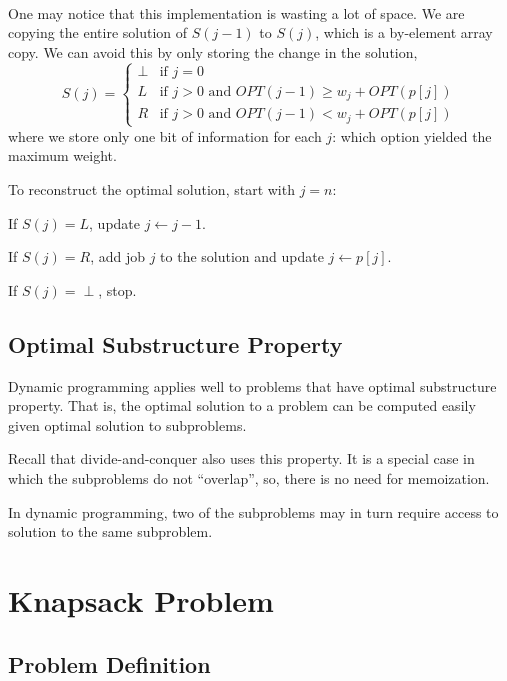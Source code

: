 {~~~}

One may notice that this implementation is wasting a lot of space. We are copying the entire solution of $S(j - 1)$ to $S(j)$, which is a by-element array copy. We can avoid this by only storing the change in the solution, \[
    S(j) = \begin{cases}
        \perp & \text{if } j = 0                                             \\
        L     & \text{if } j > 0 \text{ and } OPT(j - 1) \ge w_j + OPT(p[j]) \\
        R     & \text{if } j > 0 \text{ and } OPT(j - 1) < w_j + OPT(p[j])
    \end{cases}
\] where we store only one bit of information for each $j$: which option yielded the maximum weight. 

To reconstruct the optimal solution, start with $j = n$:
\begin{listu}
    \item If $S(j) = L$, update $j \gets j - 1$.
    \item If $S(j) = R$, add job $j$ to the solution and update $j \gets p[j]$.
    \item If $S(j) = \perp$, stop.
\end{listu}

\subsection{Optimal Substructure Property}

Dynamic programming applies well to problems that have optimal substructure property. That is, the optimal solution to a problem can be computed easily given optimal solution to subproblems.

\begin{remark}
    Recall that divide-and-conquer also uses this property. It is a special case in which the subproblems do not ``overlap'', so, there is no need for memoization.

    In dynamic programming, two of the subproblems may in turn require access to solution to the same subproblem.
\end{remark}

\section{Knapsack Problem}

\subsection{Problem Definition}

